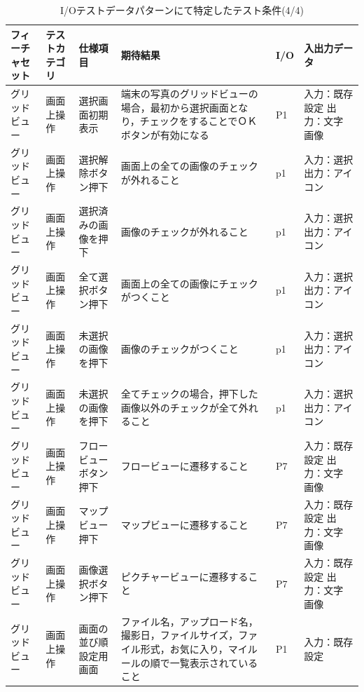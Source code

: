    \begin{table}[htbp]
      \scriptsize
      \centering
      \caption{I/Oテストデータパターンにて特定したテスト条件(4/4)}
      \begin{tabular}{|p{8em}|p{7em}|p{9em}|p{9em}|p{3em}|p{12em}|}
    \cline{1-6}   フィーチャセット & テストカテゴリ  & 仕様項目 & 期待結果  & I/O   & 入出力データ \bigstrut\\
    \hline
    \hline
    \multicolumn{1}{|l|}{グリッドビュー} & 画面上操作 & 選択画面初期表示 & 端末の写真のグリッドビューの場合，最初から選択画面となり，チェックをすることでＯＫボタンが有効になる & P1    & 入力：既存設定
出力：文字　画像 \bigstrut\\
    \hline
    \multicolumn{1}{|l|}{グリッドビュー} & 画面上操作 & 選択解除ボタン押下 & 画面上の全ての画像のチェックが外れること & p1    & 入力：選択
出力：アイコン \bigstrut\\
    \hline
    \multicolumn{1}{|l|}{グリッドビュー} & 画面上操作 & \multicolumn{1}{p{7.5em}|}{選択済みの画像を押下} & 画像のチェックが外れること & p1    & 入力：選択
出力：アイコン \bigstrut\\
    \hline
    \multicolumn{1}{|l|}{グリッドビュー} & 画面上操作 & 全て選択ボタン押下 & 画面上の全ての画像にチェックがつくこと & p1    & 入力：選択
出力：アイコン \bigstrut\\
    \hline
    \multicolumn{1}{|l|}{グリッドビュー} & 画面上操作 & 未選択の画像を押下 & 画像のチェックがつくこと & p1    & 入力：選択
出力：アイコン \bigstrut\\
    \hline
    \multicolumn{1}{|l|}{グリッドビュー} & 画面上操作 & 未選択の画像を押下 & 全てチェックの場合，押下した画像以外のチェックが全て外れること & p1    & 入力：選択
出力：アイコン \bigstrut\\
    \hline
    \multicolumn{1}{|l|}{グリッドビュー} & 画面上操作 & フロービューボタン押下 & フロービューに遷移すること & P7    & 入力：既存設定
出力：文字　画像 \bigstrut\\
    \hline
    \multicolumn{1}{|l|}{グリッドビュー} & 画面上操作 & マップビュー押下 & マップビューに遷移すること & P7    & 入力：既存設定
出力：文字　画像 \bigstrut\\
    \hline
    \multicolumn{1}{|l|}{グリッドビュー} & 画面上操作 & 画像選択ボタン押下 & ピクチャービューに遷移すること & P7    & 入力：既存設定
出力：文字　画像 \bigstrut\\
    \hline
    \multicolumn{1}{|l|}{グリッドビュー} & 画面上操作 & 画面の並び順設定用画面 & ファイル名，アップロード名，撮影日，ファイルサイズ，ファイル形式，お気に入り，マイルールの順で一覧表示されていること & P1    & 入力：既存設定

\end{tabular}
\end{table}
